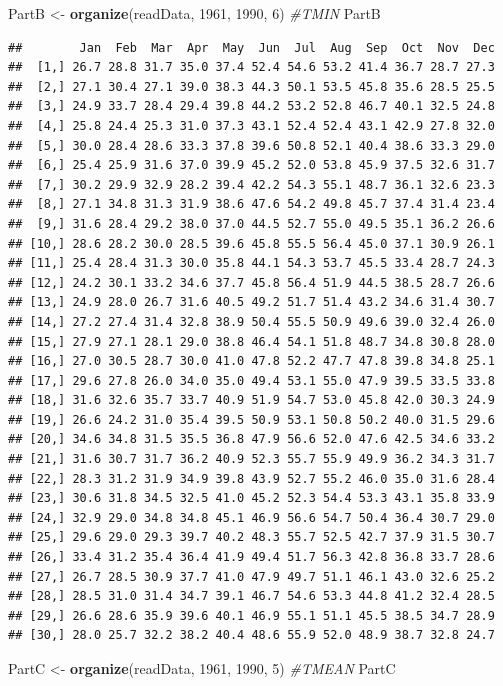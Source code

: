 \documentclass[
]{article}
\newenvironment{Shaded}{\begin{snugshade}}{\end{snugshade}}
\newcommand{\CommentTok}[1]{\textcolor[rgb]{0.56,0.35,0.01}{\textit{#1}}}
\newcommand{\DecValTok}[1]{\textcolor[rgb]{0.00,0.00,0.81}{#1}}
\newcommand{\KeywordTok}[1]{\textcolor[rgb]{0.13,0.29,0.53}{\textbf{#1}}}
\newcommand{\NormalTok}[1]{#1}
\newcommand{\StringTok}[1]{\textcolor[rgb]{0.31,0.60,0.02}{#1}}
\begin{document}
\newpage
\begin{Shaded}
\begin{Highlighting}[]
\NormalTok{PartB <-}\StringTok{ }\KeywordTok{organize}\NormalTok{(readData, }\DecValTok{1961}\NormalTok{, }\DecValTok{1990}\NormalTok{, }\DecValTok{6}\NormalTok{) }\CommentTok{#TMIN}
\NormalTok{PartB}
\end{Highlighting}
\end{Shaded}

\begin{verbatim}
##        Jan  Feb  Mar  Apr  May  Jun  Jul  Aug  Sep  Oct  Nov  Dec
##  [1,] 26.7 28.8 31.7 35.0 37.4 52.4 54.6 53.2 41.4 36.7 28.7 27.3
##  [2,] 27.1 30.4 27.1 39.0 38.3 44.3 50.1 53.5 45.8 35.6 28.5 25.5
##  [3,] 24.9 33.7 28.4 29.4 39.8 44.2 53.2 52.8 46.7 40.1 32.5 24.8
##  [4,] 25.8 24.4 25.3 31.0 37.3 43.1 52.4 52.4 43.1 42.9 27.8 32.0
##  [5,] 30.0 28.4 28.6 33.3 37.8 39.6 50.8 52.1 40.4 38.6 33.3 29.0
##  [6,] 25.4 25.9 31.6 37.0 39.9 45.2 52.0 53.8 45.9 37.5 32.6 31.7
##  [7,] 30.2 29.9 32.9 28.2 39.4 42.2 54.3 55.1 48.7 36.1 32.6 23.3
##  [8,] 27.1 34.8 31.3 31.9 38.6 47.6 54.2 49.8 45.7 37.4 31.4 23.4
##  [9,] 31.6 28.4 29.2 38.0 37.0 44.5 52.7 55.0 49.5 35.1 36.2 26.6
## [10,] 28.6 28.2 30.0 28.5 39.6 45.8 55.5 56.4 45.0 37.1 30.9 26.1
## [11,] 25.4 28.4 31.3 30.0 35.8 44.1 54.3 53.7 45.5 33.4 28.7 24.3
## [12,] 24.2 30.1 33.2 34.6 37.7 45.8 56.4 51.9 44.5 38.5 28.7 26.6
## [13,] 24.9 28.0 26.7 31.6 40.5 49.2 51.7 51.4 43.2 34.6 31.4 30.7
## [14,] 27.2 27.4 31.4 32.8 38.9 50.4 55.5 50.9 49.6 39.0 32.4 26.0
## [15,] 27.9 27.1 28.1 29.0 38.8 46.4 54.1 51.8 48.7 34.8 30.8 28.0
## [16,] 27.0 30.5 28.7 30.0 41.0 47.8 52.2 47.7 47.8 39.8 34.8 25.1
## [17,] 29.6 27.8 26.0 34.0 35.0 49.4 53.1 55.0 47.9 39.5 33.5 33.8
## [18,] 31.6 32.6 35.7 33.7 40.9 51.9 54.7 53.0 45.8 42.0 30.3 24.9
## [19,] 26.6 24.2 31.0 35.4 39.5 50.9 53.1 50.8 50.2 40.0 31.5 29.6
## [20,] 34.6 34.8 31.5 35.5 36.8 47.9 56.6 52.0 47.6 42.5 34.6 33.2
## [21,] 31.6 30.7 31.7 36.2 40.9 52.3 55.7 55.9 49.9 36.2 34.3 31.7
## [22,] 28.3 31.2 31.9 34.9 39.8 43.9 52.7 55.2 46.0 35.0 31.6 28.4
## [23,] 30.6 31.8 34.5 32.5 41.0 45.2 52.3 54.4 53.3 43.1 35.8 33.9
## [24,] 32.9 29.0 34.8 34.8 45.1 46.9 56.6 54.7 50.4 36.4 30.7 29.0
## [25,] 29.6 29.0 29.3 39.7 40.2 48.3 55.7 52.5 42.7 37.9 31.5 30.7
## [26,] 33.4 31.2 35.4 36.4 41.9 49.4 51.7 56.3 42.8 36.8 33.7 28.6
## [27,] 26.7 28.5 30.9 37.7 41.0 47.9 49.7 51.1 46.1 43.0 32.6 25.2
## [28,] 28.5 31.0 31.4 34.7 39.1 46.7 54.6 53.3 44.8 41.2 32.4 28.5
## [29,] 26.6 28.6 35.9 39.6 40.1 46.9 55.1 51.1 45.5 38.5 34.7 28.9
## [30,] 28.0 25.7 32.2 38.2 40.4 48.6 55.9 52.0 48.9 38.7 32.8 24.7
\end{verbatim}
\newpage
\begin{Shaded}
\begin{Highlighting}[]
\NormalTok{PartC <-}\StringTok{ }\KeywordTok{organize}\NormalTok{(readData, }\DecValTok{1961}\NormalTok{, }\DecValTok{1990}\NormalTok{, }\DecValTok{5}\NormalTok{) }\CommentTok{#TMEAN}
\NormalTok{PartC}
\end{Highlighting}
\end{Shaded}
\end{document}
